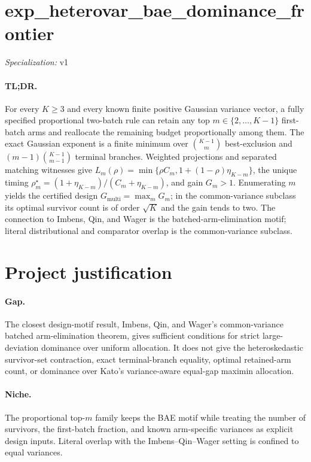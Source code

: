 \documentclass{article}
\begin{document}
\sloppy

\section*{exp\_\allowbreak{}heterovar\_\allowbreak{}bae\_\allowbreak{}dominance\_\allowbreak{}frontier}

\noindent\textit{Specialization:} v1\par

\paragraph{TL;DR.} For every \(K\ge3\) and every known finite positive Gaussian variance vector, a fully specified proportional two-batch rule can retain any top \(m\in\{2,\ldots,K-1\}\) first-batch arms and reallocate the remaining budget proportionally among them. The exact Gaussian exponent is a finite minimum over \(\binom{K-1}{m}\) best-exclusion and \((m-1)\binom{K-1}{m-1}\) terminal branches. Weighted projections and separated matching witnesses give \(L_m(\rho)=\min\{\rho C_m,1+(1-\rho)\eta_{K-m}\}\), the unique timing \(\rho_m^\star=(1+\eta_{K-m})/(C_m+\eta_{K-m})\), and gain \(G_m>1\). Enumerating \(m\) yields the certified design \(G_{\mathrm{multi}}=\max_m G_m\); in the common-variance subclass its optimal survivor count is of order \(\sqrt K\) and the gain tends to two. The connection to Imbens, Qin, and Wager is the batched-arm-elimination motif; literal distributional and comparator overlap is the common-variance subclass.

\section{Project justification}

\paragraph{Gap.} The closest design-motif result, Imbens, Qin, and Wager's common-variance batched arm-elimination theorem, gives sufficient conditions for strict large-deviation dominance over uniform allocation. It does not give the heteroskedastic survivor-set contraction, exact terminal-branch equality, optimal retained-arm count, or dominance over Kato's variance-aware equal-gap maximin allocation.

\paragraph{Niche.} The proportional top-\(m\) family keeps the BAE motif while treating the number of survivors, the first-batch fraction, and known arm-specific variances as explicit design inputs. Literal overlap with the Imbens--Qin--Wager setting is confined to equal variances.
\end{document}
